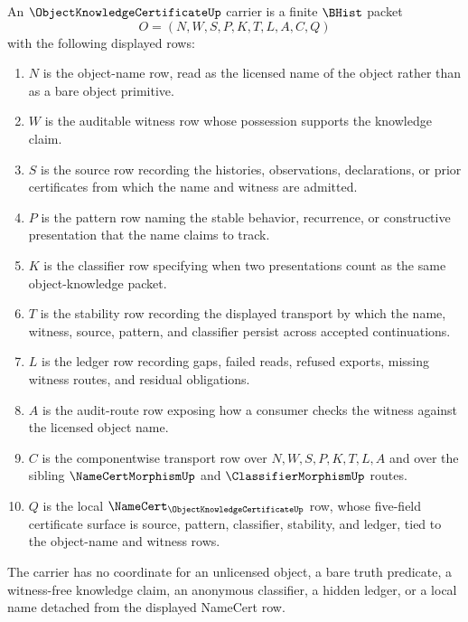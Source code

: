 \begin{definition}
\label{def:object-knowledge-certificate-carrier}
An $\ObjectKnowledgeCertificateUp$ carrier is a finite $\BHist$ packet
$$
O=(N,W,S,P,K,T,L,A,C,Q)
$$
with the following displayed rows:
\begin{enumerate}
\item $N$ is the object-name row, read as the licensed name of the object rather than as a bare object primitive.
\item $W$ is the auditable witness row whose possession supports the knowledge claim.
\item $S$ is the source row recording the histories, observations, declarations, or prior certificates from which the name and witness are admitted.
\item $P$ is the pattern row naming the stable behavior, recurrence, or constructive presentation that the name claims to track.
\item $K$ is the classifier row specifying when two presentations count as the same object-knowledge packet.
\item $T$ is the stability row recording the displayed transport by which the name, witness, source, pattern, and classifier persist across accepted continuations.
\item $L$ is the ledger row recording gaps, failed reads, refused exports, missing witness routes, and residual obligations.
\item $A$ is the audit-route row exposing how a consumer checks the witness against the licensed object name.
\item $C$ is the componentwise transport row over $N,W,S,P,K,T,L,A$ and over the sibling $\NameCertMorphismUp$ and $\ClassifierMorphismUp$ routes.
\item $Q$ is the local $\NameCert_{\ObjectKnowledgeCertificateUp}$ row, whose five-field certificate surface is source, pattern, classifier, stability, and ledger, tied to the object-name and witness rows.
\end{enumerate}
The carrier has no coordinate for an unlicensed object, a bare truth predicate, a witness-free knowledge claim, an anonymous classifier, a hidden ledger, or a local name detached from the displayed NameCert row.
\end{definition}

